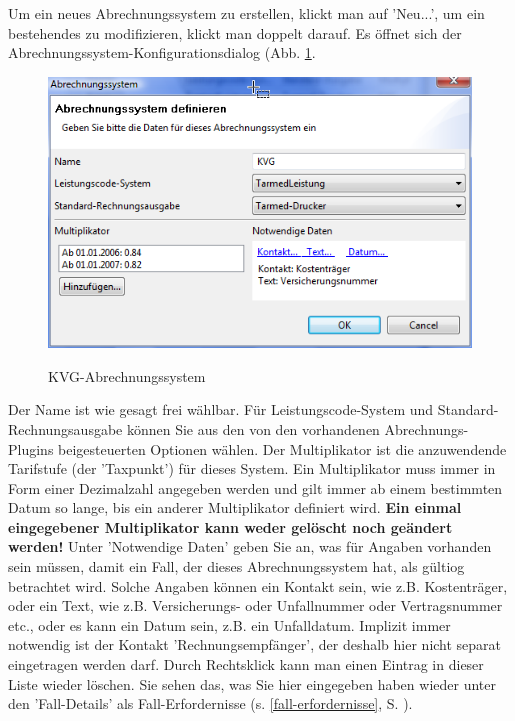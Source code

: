 \documentclass[a4paper]{scrartcl}
\begin{document}
\medskip

Um ein neues Abrechnungssystem zu erstellen, klickt man auf 'Neu...', um ein bestehendes zu modifizieren, klickt man doppelt darauf. Es öffnet sich der Abrechnungssystem-Konfigurationsdialog (Abb. \ref{fig:abr2}.
\begin{figure}
  \includegraphics{abr2}\\
  \caption{KVG-Abrechnungssystem}\label{fig:abr2}
\end{figure}
Der Name ist wie gesagt frei wählbar. Für Leistungscode-System und Standard-Rechnungsausgabe können Sie aus den von den vorhandenen Abrechnungs-Plugins beigesteuerten Optionen wählen. Der Multiplikator ist die anzuwendende Tarifstufe (der 'Taxpunkt') für dieses System. Ein Multiplikator muss immer in Form einer Dezimalzahl angegeben werden und gilt immer ab einem bestimmten Datum so lange, bis ein anderer Multiplikator definiert wird. \textbf{Ein einmal eingegebener Multiplikator kann weder gelöscht noch geändert werden!}
Unter 'Notwendige Daten' geben Sie an, was für Angaben vorhanden sein müssen, damit ein Fall, der dieses Abrechnungssystem hat, als gültiog betrachtet wird. Solche Angaben können ein Kontakt sein, wie z.B. Kostenträger, oder ein Text, wie z.B. Versicherungs- oder Unfallnummer oder Vertragsnummer etc., oder es kann ein Datum sein, z.B. ein Unfalldatum.
Implizit immer notwendig ist der Kontakt 'Rechnungsempfänger', der deshalb hier nicht separat eingetragen werden darf.
Durch Rechtsklick kann man einen Eintrag in dieser Liste wieder löschen. Sie sehen das, was Sie hier eingegeben haben wieder unter den 'Fall-Details' als Fall-Erfordernisse (s. \ref{fall-erfordernisse}, S. \pageref{fall-erfordernisse}).
\end{document}
